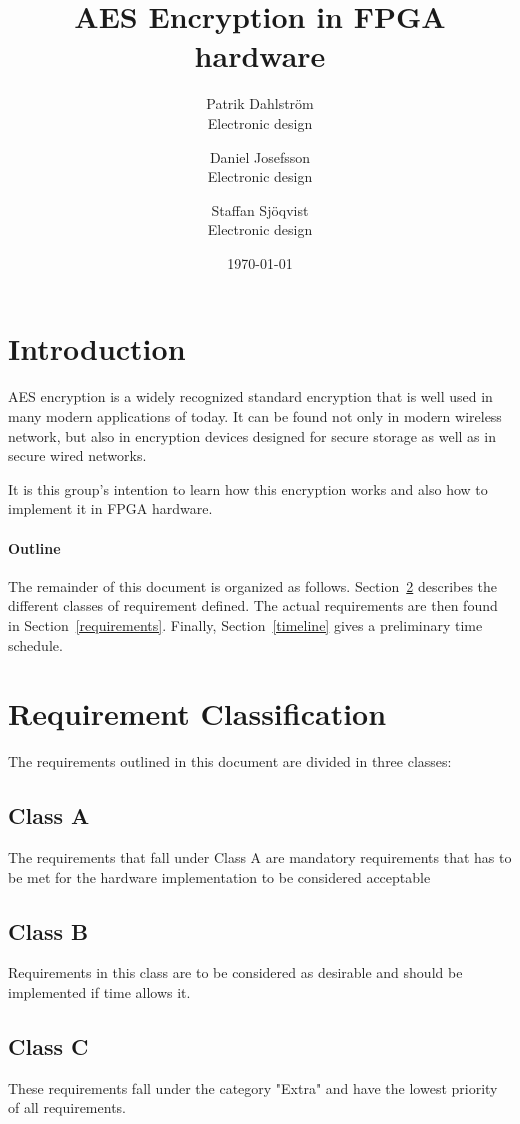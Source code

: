 \documentclass[12pt]{article}
\title{AES Encryption in FPGA hardware}
\author{
        Patrik Dahlström \\
        Electronic design\\
            \and
        Daniel Josefsson\\
        Electronic design\\
            \and
        Staffan Sjöqvist\\
        Electronic design
}
\date{\today}
\begin{document}
\maketitle


\section{Introduction}
AES encryption is a widely recognized standard encryption that is well used in many modern applications of today. It can be found not only in modern wireless network, but also in encryption devices designed for secure storage as well as in secure wired networks.

It is this group's intention to learn how this encryption works and also how to implement it in FPGA hardware.

\paragraph{Outline}
The remainder of this document is organized as follows.
Section~\ref{requirement classification} describes the different classes of requirement defined. The actual requirements are then found in Section~\ref{requirements}.
Finally, Section~\ref{timeline} gives a preliminary time schedule.

\section{Requirement Classification}\label{requirement classification}
The requirements outlined in this document are divided in three classes:
\subsection*{Class A}
The requirements that fall under Class A are mandatory requirements that has to be met for the hardware implementation to be considered acceptable

\subsection*{Class B}
Requirements in this class are to be considered as desirable and should be implemented if time allows it.

\subsection*{Class C}
These requirements fall under the category "Extra" and have the lowest priority of all requirements.
\end{document}
